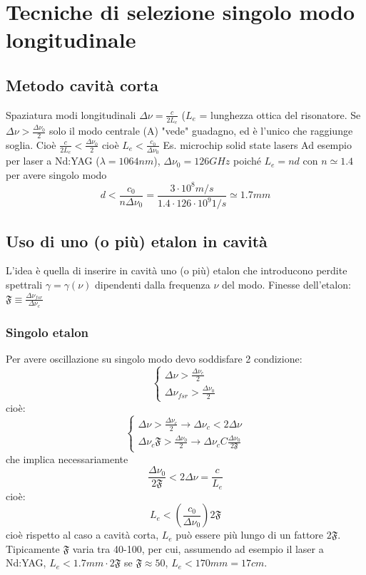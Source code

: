 \documentclass{book}
\def \D {\Delta}
\def \l {\lambda}
\theoremstyle{remark}
\begin{document}
\section{Tecniche di selezione singolo modo longitudinale}
\subsection{Metodo cavità corta}
Spaziatura modi longitudinali $\Delta \nu = \frac{c}{2L_e}$ ($L_e$ = lunghezza ottica del risonatore.
Se $\D \nu > \frac{\D \nu_0}{2}$ solo il modo centrale (A) "vede" guadagno, ed è l'unico che raggiunge soglia. Cioè $\frac{c}{2L_e} < \frac{\D \nu_0}{2}$ cioè $L_e < \frac{c_0}{\D \nu_0}$
Es. microchip solid state lasers
Ad esempio per laser a Nd:YAG ($\l = 1064 nm$), $\D \nu_0 = 126 GHz$ poiché $L_e = nd$ con $n \simeq 1.4$ per avere singolo modo
\begin{equation*}
d < \frac{c_0}{n \D \nu_0} = \frac{3\cdot 10^8 m/s}{1.4 \cdot 126 \cdot 10^9 1/s} \simeq 1.7 mm
\end{equation*}

\subsection{Uso di uno (o più) etalon in cavità}
L'idea è quella di inserire in cavità uno (o più) etalon che introducono perdite spettrali $\gamma = \gamma(\nu)$ dipendenti dalla frequenza $\nu$ del modo.
Finesse dell'etalon: $\mathfrak{F} \equiv \frac{\D \nu_{fsr}}{\D \nu_c}$
\subsubsection{Singolo etalon}
Per avere oscillazione su singolo modo devo soddisfare 2 condizione:
\begin{equation*}
\begin{cases}
\D \nu > \frac{\D \nu_c}{2}\\
\D \nu_{fsr} > \frac{\D \nu_0}{2}
\end{cases}
\end{equation*}
cioè:
\begin{equation*}
\begin{cases}
\D \nu > \frac{\D \nu_c}{2} \rightarrow \D\nu_c < 2\D\nu\\
\D \nu_c \mathfrak{F} > \frac{\D \nu_0}{2} \rightarrow \D \nu_c C \frac{\D\nu_0}{2\mathfrak{F}}
\end{cases}
\end{equation*}
che implica necessariamente
\begin{equation*}
\frac{\D \nu_0}{2 \mathfrak{F}} < 2\D\nu = \frac{c}{L_e}
\end{equation*}
cioè:
\begin{equation*}
L_e < \left(\frac{c_0}{\D\nu_0}\right) 2\mathfrak{F}
\end{equation*}
cioè rispetto al caso a cavità corta, $L_e$ può essere più lungo di un fattore $2\mathfrak{F}$. Tipicamente $\mathfrak{F}$ varia tra 40-100, per cui, assumendo ad esempio il laser a Nd:YAG, $L_e < 1.7 mm \cdot 2\mathfrak{F}$ se $\mathfrak{F} \approx 50$, $L_e < 170 mm = 17 cm$.
\end{document}
